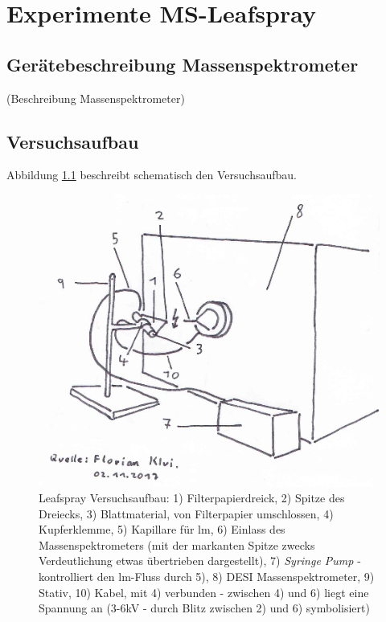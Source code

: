 \chapter{Experimente MS-Leafspray} \label{sec:MSLeafspray}

\section{Gerätebeschreibung Massenspektrometer}

(Beschreibung Massenspektrometer)

\section{Versuchsaufbau} \label{sec:Versuchsaufbau}

Abbildung \ref{fig:LeafsprayVersuchsaufbau} beschreibt schematisch den Versuchsaufbau. 

\begin{figure}[!hbtp]
  \centering
  \includegraphics[scale=0.5]{figures/Kapitel4/VWA_MSLeafspray_Versuchsaufbau.png}
  \caption[MS-Leafspray Versuchsaufbau, Quelle: Autor]{Leafspray Versuchsaufbau: 1) Filterpapierdreick, 2) Spitze des Dreiecks, 3) Blattmaterial, von Filterpapier umschlossen, 4) Kupferklemme, 5) Kapillare für \gls{lm}, 6) Einlass des Massenspektrometers (mit der markanten Spitze zwecks Verdeutlichung etwas übertrieben dargestellt), 7) \textit{Syringe Pump} - kontrolliert den \gls{lm}-Fluss durch 5), 8) DESI Massenspektrometer, 9) Stativ, 10) Kabel, mit 4) verbunden - zwischen 4) und 6) liegt eine Spannung   an (3-6kV - durch Blitz zwischen 2) und 6) symbolisiert)}
  \label{fig:LeafsprayVersuchsaufbau}
\end{figure}

